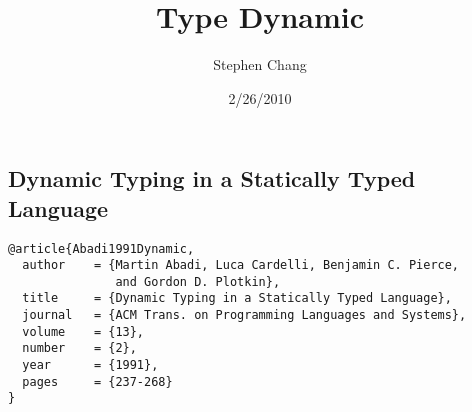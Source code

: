 \documentclass[letterpaper]{llncs}
\begin{document}
\newcommand{\Dynamic}{\texttt{Dynamic}\xspace}
\newcommand{\typecase}{\texttt{typecase}\xspace}
\newcommand{\dynamic}{\texttt{dynamic}\xspace}

\title{Type Dynamic}
\author{Stephen Chang}
\institute{}
\date{2/26/2010}
\maketitle

\subsection*{Dynamic Typing in a Statically Typed Language}%

\begin{verbatim}
@article{Abadi1991Dynamic,
  author    = {Martin Abadi, Luca Cardelli, Benjamin C. Pierce, 
               and Gordon D. Plotkin},
  title     = {Dynamic Typing in a Statically Typed Language},
  journal   = {ACM Trans. on Programming Languages and Systems},
  volume    = {13},
  number    = {2},
  year      = {1991},
  pages     = {237-268}
}
\end{verbatim}

\end{document}
